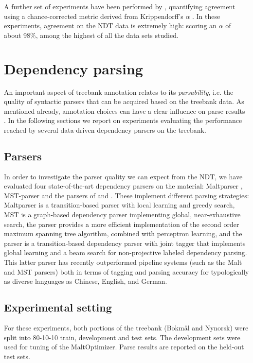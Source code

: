 \documentclass[10pt,a4paper]{article}
\begin{document}
A further set of experiments have been performed by ,
quantifying agreement using a chance-corrected metric derived from
Krippendorff's $\alpha$ \cite{Krippendorff:12}. In these experiments,
agreement on the NDT data is extremely high: scoring an $\alpha$ of about
98\%, among the highest of all the data sets studied.

\section{Dependency parsing}
An important aspect of treebank annotation relates to its
\emph{parsability}, i.e. the quality of syntactic parsers that can be
acquired based on the treebank data. As mentioned already, annotation
choices can have a clear influence on parse results
\cite{Sch:Abe:Rap:12}. In the following sections we report on experiments evaluating the performance reached by several data-driven dependency parsers on the treebank.
 
\subsection{Parsers}
In order to investigate the parser quality we
can expect from the NDT, we have evaluated four state-of-the-art
dependency parsers on the material: Maltparser \cite{Niv:Hal:Nil:06},
MST-parser \cite{McD:Per:Rib:Haj:05} and the parsers of
 and . These implement different
parsing strategies: Maltparser is a transition-based parser with local
learning and greedy search, MST is a graph-based dependency parser
implementing global, near-exhaustive search, the 
parser provides a more efficient implementation of the second order
maximum spanning tree algorithm, combined with perceptron learning, and
the  parser is a transition-based dependency
parser with joint tagger that implements global learning and a beam
search for non-projective labeled dependency parsing.  This latter
parser has recently outperformed pipeline systems (such as the Malt
and MST parsers) both in terms of tagging and parsing accuracy for
typologically as diverse languages as Chinese, English, and German.

\subsection{Experimental setting}
For these experiments, both portions of the treebank (Bokm{\aa}l and
Nynorsk) were split into 80-10-10 train, development and test sets. The development sets were used for tuning of the MaltOptimizer. Parse results are reported on the held-out test sets.
\end{document}

